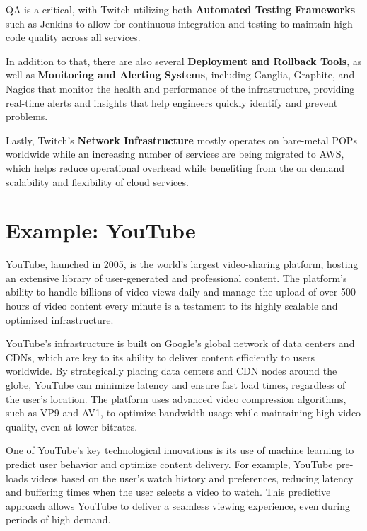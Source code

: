\begin{enumerate}
    \ac{QA} is a critical, with Twitch utilizing both \textbf{Automated Testing Frameworks} such as Jenkins to allow for continuous integration and testing to maintain high code quality across all services.

    In addition to that, there are also several \textbf{Deployment and Rollback Tools}, as well as \textbf{Monitoring and Alerting Systems}, including Ganglia, Graphite, and Nagios that monitor the health and performance of the infrastructure, providing real-time alerts and insights that help engineers quickly identify and prevent problems.

    Lastly, Twitch’s \textbf{Network Infrastructure} mostly operates on bare-metal \ac{POPs} worldwide while an increasing number of services are being migrated to \ac{AWS}, which helps reduce operational overhead while benefiting from the on demand scalability and flexibility of cloud services.

\end{enumerate}

\section{Example: YouTube}
YouTube, launched in 2005, is the world's largest video-sharing platform, hosting an extensive library of user-generated and professional content. The platform's ability to handle billions of video views daily and manage the upload of over 500 hours of video content every minute is a testament to its highly scalable and optimized infrastructure\cite{youtube_infrastructure}.

YouTube's infrastructure is built on Google's global network of data centers and CDNs, which are key to its ability to deliver content efficiently to users worldwide. By strategically placing data centers and CDN nodes around the globe, YouTube can minimize latency and ensure fast load times, regardless of the user's location\cite{google_cloud}. The platform uses advanced video compression algorithms, such as VP9 and AV1, to optimize bandwidth usage while maintaining high video quality, even at lower bitrates\cite{youtube_compression}.

One of YouTube's key technological innovations is its use of machine learning to predict user behavior and optimize content delivery. For example, YouTube pre-loads videos based on the user's watch history and preferences, reducing latency and buffering times when the user selects a video to watch\cite{youtube_ml}. This predictive approach allows YouTube to deliver a seamless viewing experience, even during periods of high demand.

